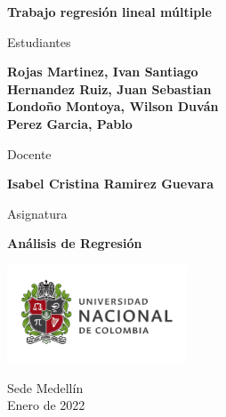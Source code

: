 \begin{titlepage}
   \Large{
   \begin{center}
       \vspace*{1cm}

       \textbf{Trabajo regresión lineal múltiple}

            
       \vspace{1cm}
       
       Estudiantes
       
       \vspace{0.5cm}
        
        
       \textbf{Rojas Martinez, Ivan Santiago} \\
       \textbf{Hernandez Ruiz, Juan Sebastian} \\
       \textbf{Londoño Montoya, Wilson Duván} \\
       \textbf{Perez Garcia, Pablo} \\
       
              \vspace{1cm}
       
       Docente
       
       \vspace{0.5cm}

       \textbf{Isabel Cristina Ramirez Guevara}
       
       \vspace{0.4cm}

       \vspace{1.5cm}
       
       Asignatura
       
       \vspace{0.5cm}

       \textbf{Análisis de Regresión}

       \vfill

            
       \vspace{0.1cm}
     
       \includegraphics[width=0.4\textwidth]{images/logounal.png}
            
       Sede Medellín\\
       Enero de 2022
       
   \end{center}
   }
\end{titlepage}